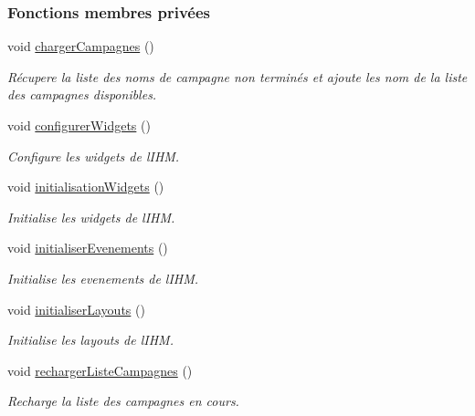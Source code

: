 \subsubsection*{Fonctions membres privées}
\begin{DoxyCompactItemize}
\item 
void \hyperlink{class_i_h_m_accueil_a1ed3efefdf929c0d2a6b6d1bb10bbc27}{charger\+Campagnes} ()
\begin{DoxyCompactList}\small\item\em Récupere la liste des noms de campagne non terminés et ajoute les nom de la liste des campagnes disponibles. \end{DoxyCompactList}\item 
void \hyperlink{class_i_h_m_accueil_a63bc796a325066423ed6146b8bab1437}{configurer\+Widgets} ()
\begin{DoxyCompactList}\small\item\em Configure les widgets de l\textquotesingle{}I\+HM. \end{DoxyCompactList}\item 
void \hyperlink{class_i_h_m_accueil_a1385a94c1a3d75d813429dc9bdc4b050}{initialisation\+Widgets} ()
\begin{DoxyCompactList}\small\item\em Initialise les widgets de l\textquotesingle{}I\+HM. \end{DoxyCompactList}\item 
void \hyperlink{class_i_h_m_accueil_a5a571ab8f264c275580501753bb00674}{initialiser\+Evenements} ()
\begin{DoxyCompactList}\small\item\em Initialise les evenements de l\textquotesingle{}I\+HM. \end{DoxyCompactList}\item 
void \hyperlink{class_i_h_m_accueil_acaaa5d756165801403ea7d73ae40186b}{initialiser\+Layouts} ()
\begin{DoxyCompactList}\small\item\em Initialise les layouts de l\textquotesingle{}I\+HM. \end{DoxyCompactList}\item 
void \hyperlink{class_i_h_m_accueil_a44074f2d8d59e0d1b7a3d50c24d2a0df}{recharger\+Liste\+Campagnes} ()
\begin{DoxyCompactList}\small\item\em Recharge la liste des campagnes en cours. \end{DoxyCompactList}\item 

\end{DoxyCompactItemize}
